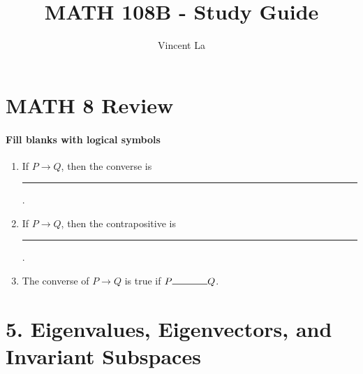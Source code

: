 \documentclass{article}
\title{MATH 108B - Study Guide}
\author{Vincent La}
\newcommand{\blank}[1]{\rule[0ex]{#1in}{0.5pt}}
\begin{document}
\maketitle

\section*{MATH 8 Review}
\paragraph{Fill blanks with logical symbols}
\begin{enumerate}
    \item If $P \rightarrow Q$, then the converse is \blank{2}.
    \item If $P \rightarrow Q$, then the contrapositive is \blank{2}.
    \item The converse of $P \rightarrow Q$ is true if $P \blank{0.5} Q$.
\end{enumerate}

\section*{5. Eigenvalues, Eigenvectors, and Invariant Subspaces}
\end{document}
